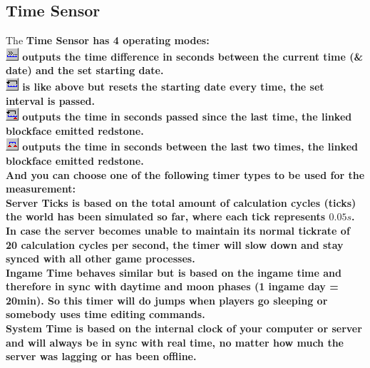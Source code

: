 \documentclass[11pt]{article} %
\begin{document}
\subsection{Time Sensor}
The \bf Time Sensor \rm has 4 operating modes:\\
\includegraphics[align=c]{time_total} outputs the time difference in seconds between the current time (\& date) and the set starting date.\\
\includegraphics[align=c]{time_int} is like above but resets the starting date every time, the set interval is passed.\\
\includegraphics[align=c]{time_reset} outputs the time in seconds passed  since the last time, the linked blockface emitted redstone.\\
\includegraphics[align=c]{time_diff} outputs the time in seconds between the last two times, the linked blockface emitted redstone.\\
And you can choose one of the following timer types to be used for the measurement:\\
\bf Server Ticks \rm is based on the total amount of calculation cycles (ticks) the world has been simulated so far, where each tick represents $0.05s$. In case the server becomes unable to maintain its normal tickrate of 20 calculation cycles per second, the timer will slow down and stay synced with all other game processes.\\
\bf Ingame Time \rm behaves similar but is based on the ingame time and therefore in sync with daytime and moon phases (1 ingame day = 20min). So this timer will do jumps when players go sleeping or somebody uses time editing commands.\\
\bf System Time \rm is based on the internal clock of your computer or server and will always be in sync with real time, no matter how much the server was lagging or has been offline.\\

\newpage
\end{document}
